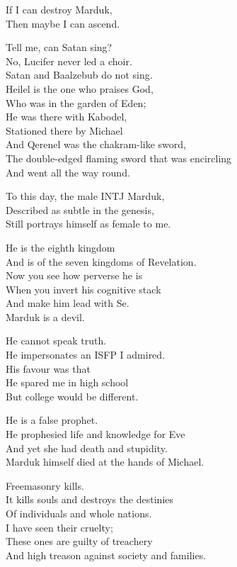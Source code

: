 \documentclass[
]{book}
\begin{document}
If I can destroy Marduk,\\
Then maybe I can ascend.

Tell me, can Satan sing?\\
No, Lucifer never led a choir.\\
Satan and Baalzebub do not sing.\\
Heilel is the one who praises God,\\
Who was in the garden of Eden;\\
He was there with Kabodel,\\
Stationed there by Michael\\
And Qerenel was the chakram-like sword,\\
The double-edged flaming sword that was encircling\\
And went all the way round.

To this day, the male INTJ Marduk,\\
Described as subtle in the genesis,\\
Still portrays himself as female to me.

He is the eighth kingdom\\
And is of the seven kingdoms of Revelation.\\
Now you see how perverse he is\\
When you invert his cognitive stack\\
And make him lead with Se.\\
Marduk is a devil.

He cannot speak truth.\\
He impersonates an ISFP I admired.\\
His favour was that\\
He spared me in high school\\
But college would be different.

He is a false prophet.\\
He prophesied life and knowledge for Eve\\
And yet she had death and stupidity.\\
Marduk himself died at the hands of Michael.

Freemasonry kills.\\
It kills souls and destroys the destinies\\
Of individuals and whole nations.\\
I have seen their cruelty;\\
These ones are guilty of treachery\\
And high treason against society and families.
\end{document}
